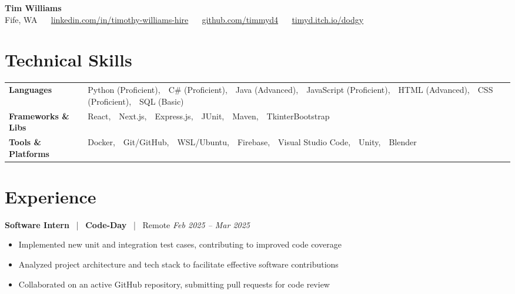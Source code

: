 \documentclass[10pt, letterpaper]{article}
\newcommand{\jobhead}[4]{%
  \vspace{5pt}%
  {\bfseries\color{dark}#1}%
  ~{\color{light}|}~%
  {\bfseries\color{navy}#2}%
  ~{\color{light}|}~%
  {\color{light}#3}%
  \hfill{\color{light}\small\textit{#4}}\\[-2pt]%
}
\newcommand{\skillrow}[2]{%
  {\bfseries #1} & #2 \\[2pt]%
}
\begin{document}

\begin{center}
  {\huge\bfseries\color{navy} Tim Williams}\\[4pt]
  {\small\color{light}
    Fife, WA
    ~\textbullet~
    \href{https://linkedin.com/in/timothy-williams-hire}{linkedin.com/in/timothy-williams-hire}
    ~\textbullet~
    \href{https://github.com/timmyd4}{github.com/timmyd4}
    ~\textbullet~
    \href{https://timyd.itch.io/dodgy}{timyd.itch.io/dodgy}
  }
\end{center}

\vspace{2pt}

\section{Technical Skills}

\begin{tabular}{@{}p{1.6in} p{5.2in}@{}}
  \skillrow{Languages}{Python (Proficient),\ \ C\# (Proficient),\ \ Java (Advanced),\ \ JavaScript (Proficient),\ \ HTML (Advanced),\ \ CSS (Proficient),\ \ SQL (Basic)}
  \skillrow{Frameworks \& Libs}{React,\ \ Next.js,\ \ Express.js,\ \ JUnit,\ \ Maven,\ \ TkinterBootstrap}
  \skillrow{Tools \& Platforms}{Docker,\ \ Git/GitHub,\ \ WSL/Ubuntu,\ \ Firebase,\ \ Visual Studio Code,\ \ Unity,\ \ Blender}
\end{tabular}

\section{Experience}

\jobhead{Software Intern}{Code-Day}{Remote}{Feb 2025 – Mar 2025}
\begin{itemize}
  \item Implemented new unit and integration test cases, contributing to improved code coverage
  \item Analyzed project architecture and tech stack to facilitate effective software contributions
  \item Collaborated on an active GitHub repository, submitting pull requests for code review
\end{itemize}
\end{document}

